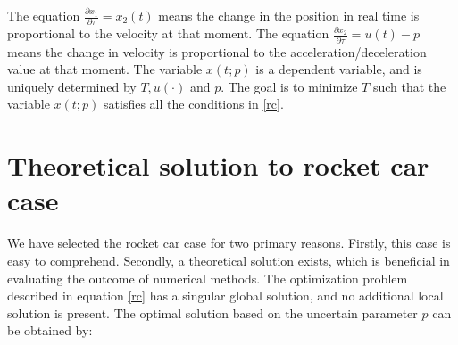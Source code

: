 \documentclass  [
  paper    = a4,
  BCOR     = 10mm,
  twoside,
  fontsize = 12pt,
  fleqn,
  toc      = bibnumbered,
  toc      = listofnumbered,
  numbers  = noendperiod,
  headings = normal,
  listof   = leveldown,
  version  = 3.03
]                                       {scrreprt}
\newcommand{\<}{\langle}
\renewcommand{\>}{\rangle}
\begin{document}
The equation $\frac{\partial x_1}{\partial \tau}= x_2(t) $ means the change in the position in real time is proportional to the velocity at that moment. The equation $\frac{\partial x_2}{\partial \tau} = u(t)-p $ means the change in velocity is proportional to the acceleration/deceleration value at that moment. 
The variable $x(t;p)$ is a dependent variable, and is uniquely determined by $T, u(\cdot)$ and $p$. The goal is to minimize $T$ such that the variable $x(t;p)$ satisfies all the conditions in \ref{rc}. 

\section{Theoretical solution to rocket car case}
We have selected the rocket car case for two primary reasons. Firstly, this case is easy to comprehend. Secondly, a theoretical solution exists, which is beneficial in evaluating the outcome of numerical methods. The optimization problem described in equation \ref{rc} has a singular global solution, and no additional local solution is present. The optimal solution based on the uncertain parameter $p$ can be obtained by:
\end{document}
